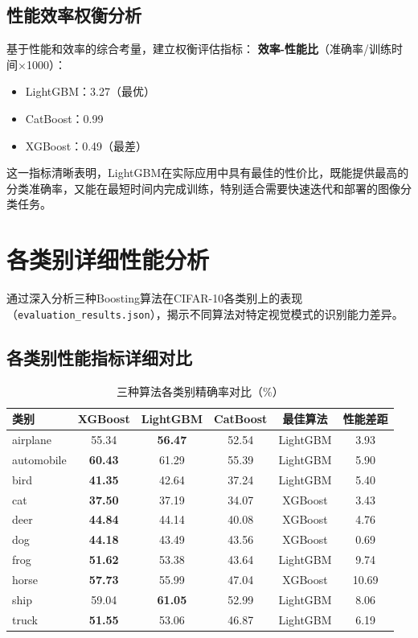\documentclass[UTF8]{report}
\theoremstyle{MyLineTheoremStyle} %
\theoremstyle{MyBlockTheoremStyle} %
\theoremstyle{MySubsubsectionStyle} %
\begin{document}
\subsection{性能效率权衡分析}
基于性能和效率的综合考量，建立权衡评估指标：
\textbf{效率-性能比}（准确率/训练时间×1000）：
\begin{itemize}
    \item LightGBM：3.27（最优）
    \item CatBoost：0.99
    \item XGBoost：0.49（最差）
\end{itemize}
这一指标清晰表明，LightGBM在实际应用中具有最佳的性价比，既能提供最高的分类准确率，又能在最短时间内完成训练，特别适合需要快速迭代和部署的图像分类任务。

\section{各类别详细性能分析}
通过深入分析三种Boosting算法在CIFAR-10各类别上的表现（\texttt{evaluation\_results.json}），揭示不同算法对特定视觉模式的识别能力差异。

\subsection{各类别性能指标详细对比}
\begin{table}[H]
    \centering
    \caption{三种算法各类别精确率对比（\%）}
    \begin{tabular}{lccccc}
        \toprule
        类别 & XGBoost & LightGBM & CatBoost & 最佳算法 & 性能差距 \\ \midrule
        airplane & 55.34 & \textbf{56.47} & 52.54 & LightGBM & 3.93 \\
        automobile & \textbf{60.43} & 61.29 & 55.39 & LightGBM & 5.90 \\
        bird & \textbf{41.35} & 42.64 & 37.24 & LightGBM & 5.40 \\
        cat & \textbf{37.50} & 37.19 & 34.07 & XGBoost & 3.43 \\
        deer & \textbf{44.84} & 44.14 & 40.08 & XGBoost & 4.76 \\
        dog & \textbf{44.18} & 43.49 & 43.56 & XGBoost & 0.69 \\
        frog & \textbf{51.62} & 53.38 & 43.64 & LightGBM & 9.74 \\
        horse & \textbf{57.73} & 55.99 & 47.04 & XGBoost & 10.69 \\
        ship & 59.04 & \textbf{61.05} & 52.99 & LightGBM & 8.06 \\
        truck & \textbf{51.55} & 53.06 & 46.87 & LightGBM & 6.19 \\ \bottomrule
    \end{tabular}
\end{table}
\end{document}
